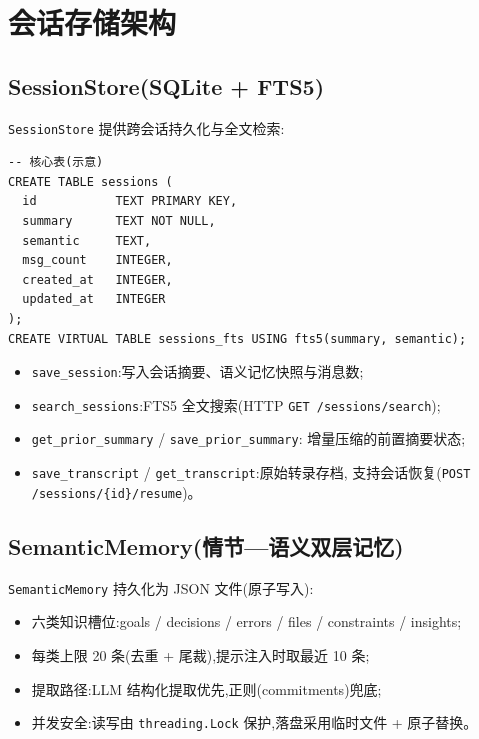 \documentclass[11pt,a4paper]{article}
\begin{document}
\section{会话存储架构}

\subsection{SessionStore(SQLite + FTS5)}

\texttt{SessionStore} 提供跨会话持久化与全文检索:

\begin{lstlisting}[language={}]
-- 核心表(示意)
CREATE TABLE sessions (
  id           TEXT PRIMARY KEY,
  summary      TEXT NOT NULL,
  semantic     TEXT,
  msg_count    INTEGER,
  created_at   INTEGER,
  updated_at   INTEGER
);
CREATE VIRTUAL TABLE sessions_fts USING fts5(summary, semantic);
\end{lstlisting}

\begin{itemize}
  \item \texttt{save\_session}:写入会话摘要、语义记忆快照与消息数;
  \item \texttt{search\_sessions}:FTS5 全文搜索(HTTP \texttt{GET /sessions/search});
  \item \texttt{get\_prior\_summary} / \texttt{save\_prior\_summary}:
        增量压缩的前置摘要状态;
  \item \texttt{save\_transcript} / \texttt{get\_transcript}:原始转录存档,
        支持会话恢复(\texttt{POST /sessions/\{id\}/resume})。
\end{itemize}

\subsection{SemanticMemory(情节—语义双层记忆)}

\texttt{SemanticMemory} 持久化为 JSON 文件(原子写入):
\begin{itemize}
  \item 六类知识槽位:goals / decisions / errors / files / constraints / insights;
  \item 每类上限 20 条(去重 + 尾裁),提示注入时取最近 10 条;
  \item 提取路径:LLM 结构化提取优先,正则(commitments)兜底;
  \item 并发安全:读写由 \texttt{threading.Lock} 保护,落盘采用临时文件 + 原子替换。
\end{itemize}
\end{document}
